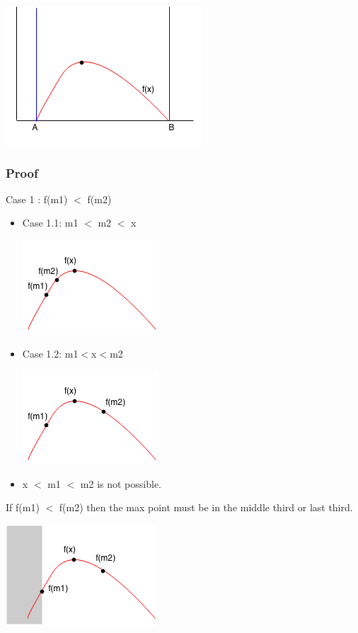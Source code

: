 \documentclass[11pt,oneside]{book}
\makeatletter
\def\maxwidth#1{\ifdim\Gin@nat@width>#1 #1\else\Gin@nat@width\fi}
\makeatother
\begin{document}
\vspace{5px}\includegraphics[width=\maxwidth{\textwidth}]{ternarysearch.png}

\subsubsection{Proof}

Case 1 : f(m1) $<$ f(m2)

\begin{itemize}
\item Case 1.1:  m1 $<$ m2 $<$ x

\vspace{5px}\includegraphics[width=\maxwidth{\textwidth}]{ternarycase11.png}
\item Case 1.2: m1$<$x$<$m2

\vspace{5px}\includegraphics[width=\maxwidth{\textwidth}]{ternarycase12.png}
\item x $<$ m1 $<$ m2 is not possible.
\end{itemize}

If f(m1) $<$ f(m2) then the max point must be in the middle third or last third.

\vspace{5px}\includegraphics[width=\maxwidth{\textwidth}]{ternarycase1.png}
\end{document}
